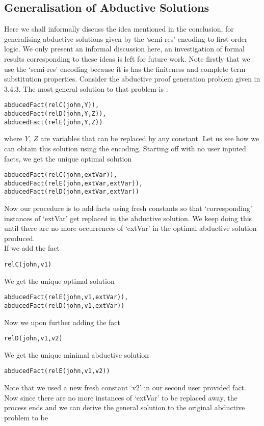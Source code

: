 \subsection{Generalisation of Abductive Solutions}\label{sec:generalisation_sol}
Here we shall informally discuss the idea mentioned in the conclusion, for generalising abductive solutions given by the ‘semi-res’ encoding to first order logic. We only present an informal discussion here, an investigation of formal results corresponding to these ideas is left for future work. Note firstly that we use the ‘semi-res’ encoding because it is has the finiteness and complete term substitution properties. Consider the abductive proof generation problem given in 3.4.3. The most general solution to that problem is : \begin{lstlisting}[frame = none] 
abducedFact(relC(john,Y)), 
abducedFact(relD(john,Y,Z)), 
abducedFact(relE(john,Y,Z))
\end{lstlisting}
where $Y$, $Z$ are variables that can be replaced by any constant. Let us see how we can obtain this solution using the encoding. Starting off with no user inputed facts, we get the unique optimal solution
\begin{lstlisting}[frame = none]
abducedFact(relC(john,extVar)), 
abducedFact(relE(john,extVar,extVar)),
abducedFact(relD(john,extVar,extVar))
\end{lstlisting}
Now our procedure is to add facts using fresh constants so that ‘corresponding’ instances of ‘extVar’ get replaced in the abductive solution. We keep doing this until there are no more occurrences of ‘extVar’ in the optimal abductive solution produced.\\ If we add the fact 
\begin{lstlisting}[frame = none]
relC(john,v1)
\end{lstlisting}
We get the unique optimal solution 
\begin{lstlisting}[frame = none]
abducedFact(relE(john,v1,extVar)),
abducedFact(relD(john,v1,extVar))
\end{lstlisting}
Now we upon further adding the fact 
\begin{lstlisting}[frame = none]
relD(john,v1,v2)
\end{lstlisting}
We get the unique minimal abductive solution 
\begin{lstlisting}[frame = none]
abducedFact(relE(john,v1,v2))
\end{lstlisting}
Note that we used a new fresh constant ‘v2’ in our second user provided fact.
Now since there are no more instances of ‘extVar’ to be replaced away, the process ends and we can derive the general solution to the original abductive problem to be 
